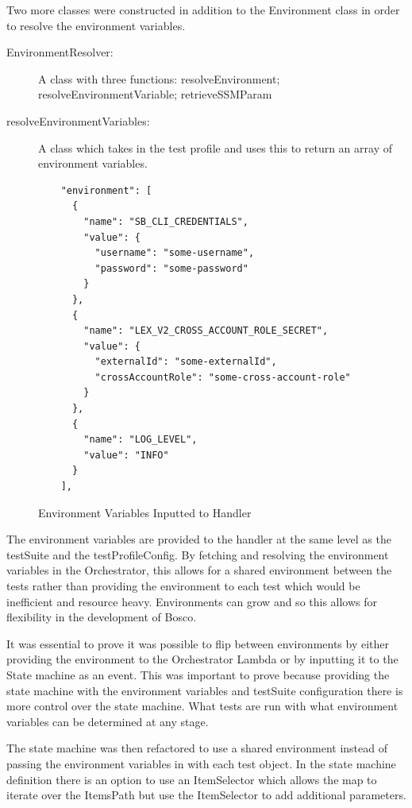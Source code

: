 \documentclass[12pt,a4paper,titlepage]{report}
\begin{document}
Two more classes were constructed in addition to the Environment class in order to resolve the environment variables. 
\begin{description}
  \item[EnvironmentResolver:]A class with three functions: resolveEnvironment; resolveEnvironmentVariable; retrieveSSMParam
  \item[resolveEnvironmentVariables:]A class which takes in the test profile and uses this to return an array of environment variables.
\end{description}

\begin{figure}[H]
  \begin{tcolorbox}
   \begin{verbatim}
    "environment": [
      {
        "name": "SB_CLI_CREDENTIALS",
        "value": {
          "username": "some-username",
          "password": "some-password"
        }
      },
      {
        "name": "LEX_V2_CROSS_ACCOUNT_ROLE_SECRET",
        "value": {
          "externalId": "some-externalId",
          "crossAccountRole": "some-cross-account-role"
        }
      },
      {
        "name": "LOG_LEVEL",
        "value": "INFO"
      }
    ],
 \end{verbatim}
  \end{tcolorbox}
  \caption{Environment Variables Inputted to Handler}
 \end{figure}

The environment variables are provided to the handler at the same level as the testSuite and the testProfileConfig. 
By fetching and resolving the environment variables in the Orchestrator, this allows for a shared environment between the tests rather 
than providing the environment to each test which would be inefficient and resource heavy. Environments can grow and so this allows 
for flexibility in the development of Bosco.

It was essential to prove it was possible to flip between environments by either providing the environment to the
Orchestrator Lambda or by inputting it to the State machine as an event. 
This was important to prove because providing the state machine with the environment variables and testSuite configuration there is more control over the state
machine. What tests are run with what environment variables can be determined at any stage.

The state machine was then refactored to use a shared environment instead of
passing the environment variables in with each test object. In the state machine definition there is an option to
use an ItemSelector which allows the map to iterate over the ItemsPath but use the ItemSelector to add additional
parameters.
\end{document}
